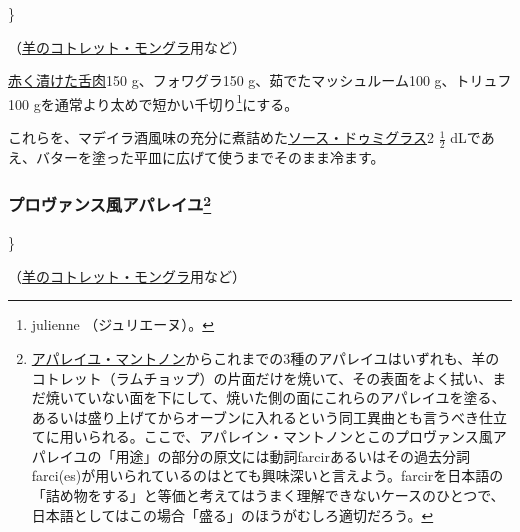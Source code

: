 \begin{recette}

\}

（\protect\hyperlink{cotelettes-monglas}{羊のコトレット・モングラ}用など）

\protect\hyperlink{saumure-liquide-pour-langues}{赤く漬けた舌肉}150
g、フォワグラ150 g、茹でたマッシュルーム100 g、トリュフ100
gを通常より太めで短かい千切り\footnote{julienne （ジュリエーヌ）。}にする。

これらを、マデイラ酒風味の充分に煮詰めた\protect\hyperlink{sauce-demi-glace}{ソース・ドゥミグラス}2
\(\frac{1}{2}\)
dLであえ、バターを塗った平皿に広げて使うまでそのまま冷ます。

\atoaki{}

\hypertarget{appareil-provencal}{%
\subsubsection[プロヴァンス風アパレイユ]{\texorpdfstring{プロヴァンス風アパレイユ\footnote{\protect\hyperlink{appareil-maintenon}{アパレイユ・マントノン}からこれまでの3種のアパレイユはいずれも、羊のコトレット（ラムチョップ）の片面だけを焼いて、その表面をよく拭い、まだ焼いていない面を下にして、焼いた側の面にこれらのアパレイユを塗る、あるいは盛り上げてからオーブンに入れるという同工異曲とも言うべき仕立てに用いられる。ここで、アパレイン・マントノンとこのプロヴァンス風アパレイユの「用途」の部分の原文には動詞farcirあるいはその過去分詞farci(es)が用いられているのはとても興味深いと言えよう。farcirを日本語の「詰め物をする」と等価と考えてはうまく理解できないケースのひとつで、日本語としてはこの場合「盛る」のほうがむしろ適切だろう。}}{プロヴァンス風アパレイユ}}\label{appareil-provencal}}


\}

（\protect\hyperlink{cotelettes-monglas}{羊のコトレット・モングラ}用など）


\end{recette}
